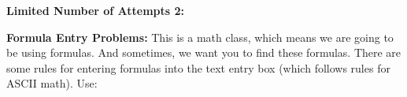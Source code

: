 \documentclass[pdftex, brazil, 12pt, twoside]{article}
\begin{document}
\begin{figure}[H]
  \begin{center}
    \label{fig:exqst03}
  \end{center}
\end{figure}

\textbf{Limited Number of Attempts 2:}

\begin{figure}[H]
  \begin{center}
    \label{fig:exqst04}
  \end{center}
\end{figure}

\textbf{Formula Entry Problems:}
This is a math class, which means we are going to be using formulas. And sometimes,
we want you to find these formulas. There are some rules for entering formulas into
the text entry box (which follows rules for ASCII math). Use:
\end{document}
